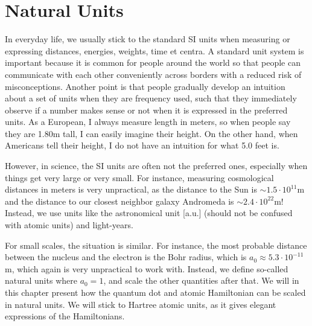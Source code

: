 \chapter{Natural Units} \label{app:units}
In everyday life, we usually stick to the standard SI units when measuring or expressing distances, energies, weights, time et centra. A standard unit system is important because it is common for people around the world so that people can communicate with each other conveniently across borders with a reduced risk of misconceptions. Another point is that people gradually develop an intuition about a set of units when they are frequency used, such that they immediately observe if a number makes sense or not when it is expressed in the preferred units. As a European, I always measure length in meters, so when people say they are 1.80m tall, I can easily imagine their height. On the other hand, when Americans tell their height, I do not have an intuition for what 5.0 feet is. 

However, in science, the SI units are often not the preferred ones, especially when things get very large or very small. For instance, measuring cosmological distances in meters is very unpractical, as the distance to the Sun is $\sim1.5\cdot10^{11}$m and the distance to our closest neighbor galaxy Andromeda is $\sim 2.4\cdot10^{22}$m! Instead, we use units like the astronomical unit [a.u.] (should not be confused with atomic units) and light-years. 

For small scales, the situation is similar. For instance, the most probable distance between the nucleus and the electron is the Bohr radius, which is $a_0\approx5.3\cdot10^{-11}$m, which again is very unpractical to work with. Instead, we define so-called natural units where $a_0=1$, and scale the other quantities after that. We will in this chapter present how the quantum dot and atomic Hamiltonian can be scaled in natural units. We will stick to Hartree atomic units, as it gives elegant expressions of the Hamiltonians.  

